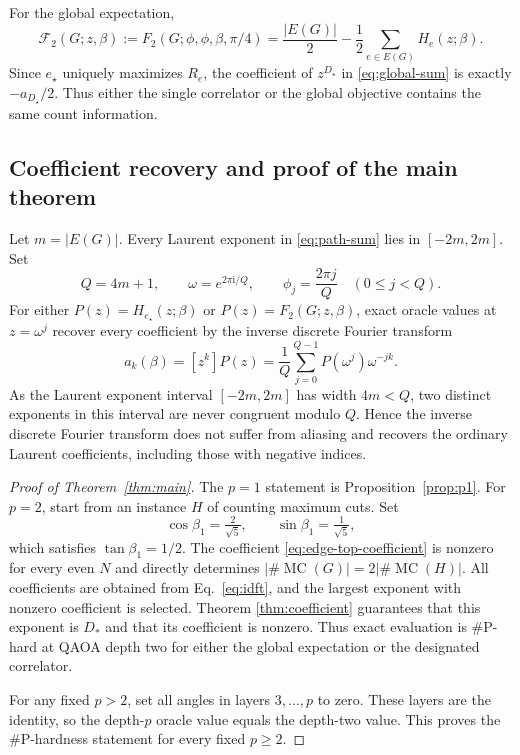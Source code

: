 \documentclass[11pt]{article}
\newcommand{\mc}{\operatorname{MC}}
\newcommand{\M}{\#\mc}
\newcommand{\ii}{\mathrm{i}}
\newcommand{\sh}[1]{{#1}}
\begin{document}
For the global expectation,
\begin{equation}
 \mathcal{F}_2(G;z,\beta):=F_2(G;\phi,\phi,\beta,\pi/4)=\frac{|E(G)|}{2}-\frac12\sum_{e\in E(G)}H_e(z;\beta).
 \label{eq:global-sum}
\end{equation}
Since $e_\star$ uniquely maximizes $R_e$, the coefficient of $z^{D_\star}$ in
\eqref{eq:global-sum} is exactly $-a_{D_\star}/2$.  Thus either the single correlator or
the global objective contains the same count information.



\subsection{Coefficient recovery and proof of the main theorem}\label{sec:hardness}

Let $m=|E(G)|$.  Every Laurent exponent in \eqref{eq:path-sum} lies in $[-2m,2m]$.  Set
\begin{equation}
 Q=4m+1,
 \qquad
 \omega=e^{2\pi\ii/Q},
 \qquad
 \phi_j=\frac{2\pi j}{Q}
 \quad(0\leq j<Q).
 \label{eq:dft-points}
\end{equation}
For either $P(z)=H_{e_\star}(z;\beta)$ or $P(z)=F_2(G;z,\beta)$, exact oracle values at
$z=\omega^j$ recover every coefficient by the inverse discrete Fourier transform
\begin{equation}
 a_k(\beta)=[z^k]P(z)=\frac1Q\sum_{j=0}^{Q-1}P(\omega^j)\omega^{-jk}.
 \label{eq:idft}
\end{equation}
%
\sh{%
As the Laurent exponent interval \([-2m,2m]\) has width
\(4m<Q\), two distinct exponents in this interval are never congruent
modulo \(Q\).  Hence the inverse discrete Fourier transform %
does not suffer from aliasing and recovers the ordinary Laurent coefficients, including
those with negative indices.}

\begin{proof}[Proof of Theorem~\ref{thm:main}]
The $p=1$ statement is Proposition~\ref{prop:p1}.  For $p=2$, start from an instance $H$ of counting
maximum cuts. 
Set
\begin{equation}
 \cos\beta_1=\tfrac2{\sqrt5},
 \qquad
 \sin\beta_1=\tfrac1{\sqrt5},
\end{equation}
which satisfies $\tan \beta_1=1/2$. 
The coefficient \eqref{eq:edge-top-coefficient} is nonzero for every even $N$ and directly
determines $|\M(G)|=2|\M(H)|$.  
\sh{%
All coefficients are obtained from Eq.~\eqref{eq:idft}, and the largest exponent with nonzero coefficient is selected. Theorem \ref{thm:coefficient} guarantees that this exponent is $D_*$
and that its coefficient is nonzero.}
Thus exact evaluation is $\#$P-hard at QAOA depth two %
for either the global expectation or the designated correlator.

For any fixed $p>2$, set all angles in layers $3,\ldots,p$ to zero.  These layers are the
identity, so the depth-$p$ oracle value equals the depth-two value.  This proves the
$\#$P-hardness statement for every fixed $p\geq2$.
\end{proof}
\end{document}

